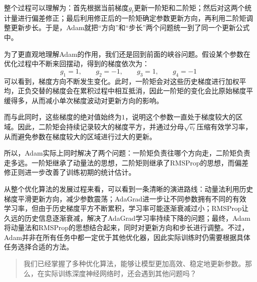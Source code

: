 整个过程可以理解为：首先根据当前梯度$g_t$更新一阶矩和二阶矩；然后对这两个统计量进行偏差修正；最后利用修正后的一阶矩确定参数更新方向，再利用二阶矩调整更新步长。于是，Adam就把“方向”和“步长”两个问题统一到了同一个更新公式中。

为了更直观地理解Adam的作用，我们还是回到前面的峡谷问题。假设某个参数在优化过程中不断来回摆动，得到的梯度依次为：
$$
g_1=1,\qquad g_2=-1,\qquad g_3=1,\qquad g_4=-1
$$
可以看到，梯度方向不断发生变化。此时，一阶矩会对这些历史梯度进行加权平均，正负交替的梯度会在累积过程中相互抵消，因此一阶矩的变化会比原始梯度平缓得多，从而减小单次梯度波动对更新方向的影响。

而与此同时，这些梯度的绝对值始终为$1$，说明这个参数一直处于梯度较大的区域。因此，二阶矩会持续记录较大的梯度平方，并通过分母$\sqrt{\hat{v}_t}$压缩有效学习率，从而避免参数在梯度较大的区域进行过大的更新。

所以，Adam实际上同时解决了两个问题：一阶矩负责往哪个方向走，二阶矩负责走多远。一阶矩继承了动量法的思想，二阶矩则继承了RMSProp的思想，而偏差修正则进一步改善了训练初期的统计估计。

从整个优化算法的发展过程来看，可以看到一条清晰的演进路线：动量法利用历史梯度平滑更新方向，减少参数震荡；AdaGrad进一步让不同参数拥有不同的有效学习率，但由于历史梯度平方不断累积，学习率可能逐渐衰减过小；RMSProp让久远的历史信息逐渐衰减，解决了AdaGrad学习率持续下降的问题；最终，Adam将动量法和RMSProp的思想结合起来，同时对更新方向和步长进行调整。不过，Adam并非在所有任务中都一定优于其他优化器，因此实际训练时仍需要根据具体任务选择合适的方法。

\begin{quote}
    我们已经掌握了多种优化算法，能够让模型更加高效、稳定地更新参数。那么，在实际训练深度神经网络时，还会遇到其他问题吗？
\end{quote}
